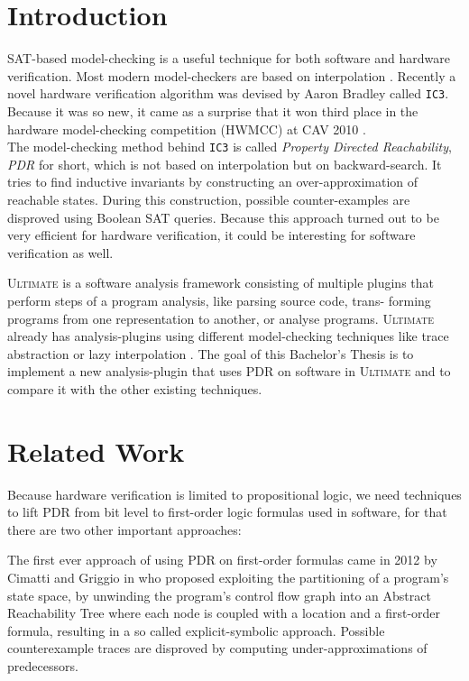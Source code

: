 \documentclass[11pt, a4paper, BCOR=10mm, ngerman, oneside]{scrbook}
\begin{document}
\chapter{Introduction}
SAT-based model-checking is a useful technique for both software and hardware verification. Most modern model-checkers are based on interpolation \cite{Zitat00}. 
Recently a novel hardware verification algorithm was devised by Aaron Bradley \cite{Zitat01} called \texttt{IC3}.
Because it was so new, it came as a surprise that it won third place in the hardware
model-checking competition (HWMCC) at CAV 2010 \cite{cav}. \\ The model-checking method behind \texttt{IC3} is called \textsl{Property Directed Reachability}, \textsl{PDR} for short, which is not based on interpolation but on backward-search. It tries to find inductive invariants by constructing an over-approximation of reachable states. During this construction, possible counter-examples are disproved using Boolean SAT queries. Because this approach turned out to be very efficient for hardware verification, it could be interesting for software verification as well. \\ \par
\textsc{Ultimate} \cite{Zitat02} is a software analysis framework consisting of multiple plugins that perform steps of a program analysis, like parsing source code, trans-
forming programs from one representation to another, or analyse programs.
 \textsc{Ultimate} already has analysis-plugins using different model-checking techniques like trace abstraction \cite{Zitat06} or lazy interpolation \cite{Zitat07}.
The goal of this Bachelor's Thesis is to implement a new analysis-plugin that uses PDR on software in \textsc{Ultimate} and to compare it with the other existing techniques.


\chapter{Related Work}
Because hardware verification is limited to propositional logic, we need techniques to lift PDR from bit level to first-order logic formulas used in software, for that there are two other important approaches: \par

The first ever approach of using PDR on first-order formulas came in 2012 by Cimatti and Griggio in \cite{Zitat04} who proposed exploiting the partitioning of a program's state space, by unwinding the program's control flow graph into an Abstract Reachability Tree where each node is coupled with a location and a first-order formula, resulting in a so called explicit-symbolic approach. Possible counterexample traces are disproved by computing under-approximations of predecessors. 
\end{document}
